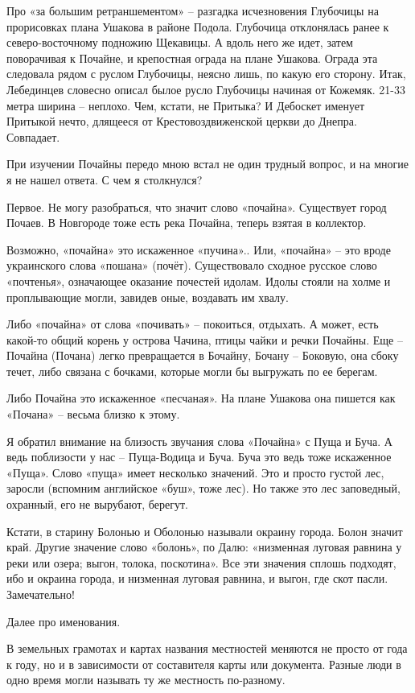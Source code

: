 Про «за большим ретраншементом» – разгадка исчезновения Глубочицы на прорисовках плана Ушакова в районе Подола. Глубочица отклонялась ранее к северо-восточному подножию Щекавицы. А вдоль него же идет, затем поворачивая к Почайне, и крепостная ограда на плане Ушакова. Ограда эта следовала рядом с руслом Глубочицы, неясно лишь, по какую его сторону. Итак, Лебединцев словесно описал былое русло Глубочицы начиная от Кожемяк. 21-33 метра ширина – неплохо. Чем, кстати, не Притыка? И Дебоскет именует Притыкой нечто, длящееся от Крестовоздвиженской церкви до Днепра. Совпадает.

При изучении Почайны передо мною встал не один трудный вопрос, и на многие я не нашел ответа. С чем я столкнулся? 

Первое. Не могу разобраться, что значит слово «почайна». Существует город Почаев. В Новгороде тоже есть река Почайна, теперь взятая в коллектор.

Возможно, «почайна» это искаженное «пучина».. Или, «почайна» – это вроде украинского слова «пошана» (почёт). Существовало сходное русское слово «почтенья», означающее оказание почестей идолам. Идолы стояли на холме и проплывающие могли, завидев оные, воздавать им хвалу. 

Либо «почайна» от слова «почивать» – покоиться, отдыхать. А может, есть какой-то общий корень у острова Чачина, птицы чайки и речки Почайны. Еще – Почайна (Почана) легко превращается в Бочайну, Бочану – Боковую, она сбоку течет, либо связана с бочками, которые могли бы выгружать по ее берегам.

Либо Почайна это искаженное «песчаная». На плане Ушакова она пишется как «Почана» – весьма близко к этому.

Я обратил внимание на близость звучания слова «Почайна» с Пуща и Буча. А ведь поблизости у нас – Пуща-Водица и Буча. Буча это ведь тоже искаженное «Пуща». Слово «пуща» имеет несколько значений. Это и просто густой лес, заросли (вспомним английское «буш», тоже лес). Но также это лес заповедный, охранный, его не вырубают, берегут.

Кстати, в старину Болонью и Оболонью называли окраину города. Болон значит край. Другие значение слово «болонь», по Далю: «низменная луговая равнина у реки или  озера; выгон, толока, поскотина». Все эти значения сплошь подходят, ибо и окраина города, и низменная луговая равнина, и выгон, где скот пасли. Замечательно!

Далее про именования.

В земельных грамотах и картах названия местностей меняются не просто от года к году, но и в зависимости от составителя карты или документа. Разные люди в одно время могли называть ту же местность по-разному.

